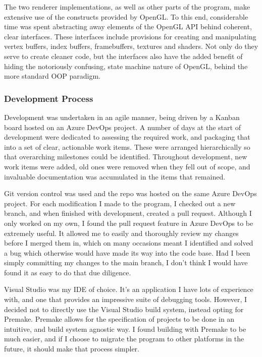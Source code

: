 The two renderer implementations, as well as other parts of the program, make extensive use of the constructs provided by OpenGL. To this end, considerable time was spent abstracting away elements of the OpenGL API behind coherent, clear interfaces. These interfaces include provisions for creating and manipulating vertex buffers, index buffers, framebuffers, textures and shaders. Not only do they serve to create cleaner code, but the interfaces also have the added benefit of hiding the notoriously confusing, state machine nature of OpenGL, behind the more standard OOP paradigm.

\subsubsection{Development Process}

Development was undertaken in an agile manner, being driven by a Kanban board hosted on an Azure DevOps project. A number of days at the start of development were dedicated to assessing the required work, and packaging that into a set of clear, actionable work items. These were arranged hierarchically so that overarching milestones could be identified. Throughout development, new work items were added, old ones were removed when they fell out of scope, and invaluable documentation was accumulated in the items that remained.

Git version control was used and the repo was hosted on the same Azure DevOps project. For each modification I made to the program, I checked out a new branch, and when finished with development, created a pull request. Although I only worked on my own, I found the pull request feature in Azure DevOps to be extremely useful. It allowed me to easily and thoroughly review my changes before I merged them in, which on many occasions meant I identified and solved a bug which otherwise would have made its way into the code base. Had I been simply committing my changes to the main branch, I don't think I would have found it as easy to do that due diligence.

Visual Studio was my IDE of choice. It's an application I have lots of experience with, and one that provides an impressive suite of debugging tools. However, I decided not to directly use the Visual Studio build system, instead opting for Premake. Premake allows for the specification of projects to be done in an intuitive, and build system agnostic way. I found building with Premake to be much easier, and if I choose to migrate the program to other platforms in the future, it should make that process simpler.

